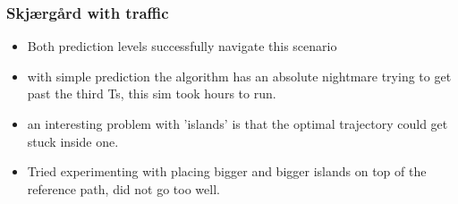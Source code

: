 \subsubsection{Skjærgård with traffic}
\begin{itemize}

    \item Both prediction levels successfully navigate this scenario
    \item with simple prediction the algorithm has an absolute nightmare trying to get past the third \gls{Ts}, this sim took hours to run.
    \item an interesting problem with 'islands' is that the optimal trajectory could get stuck inside one.
    \item Tried experimenting with placing bigger and bigger islands on top of the reference path, did not go too well.
\end{itemize}

